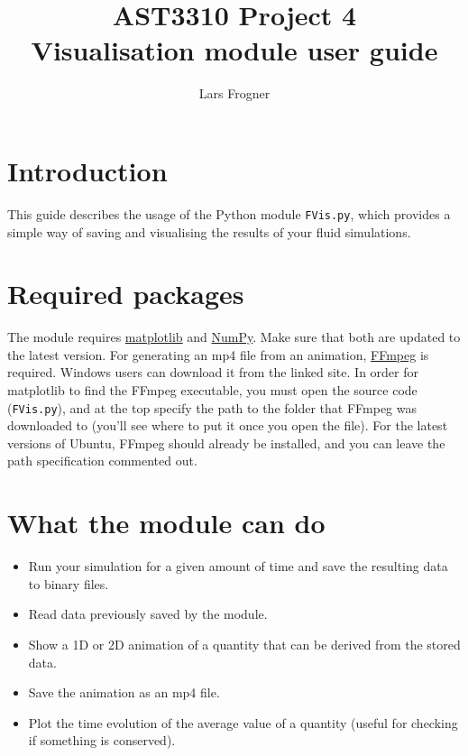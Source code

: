 \documentclass{article}
\title{AST3310 Project 4\\Visualisation module user guide}
\author{Lars Frogner}
\newcommand{\ttt}[1]{\texttt{#1}}
\begin{document}

\maketitle

\newpage

\tableofcontents

\newpage
{}

\section{Introduction}
\label{sec:intr}
This guide describes the usage of the Python module \ttt{FVis.py}, which provides a simple way of saving and visualising the results of your fluid simulations.

\section{Required packages}
\label{sec:pack}
The module requires \href{http://matplotlib.org/}{matplotlib} and \href{http://www.numpy.org/}{NumPy}. Make sure that both are updated to the latest version. For generating an mp4 file from an animation, \href{https://ffmpeg.org/}{FFmpeg} is required. Windows users can download it from the linked site. In order for matplotlib to find the FFmpeg executable, you must open the source code (\ttt{FVis.py}), and at the top specify the path to the folder that FFmpeg was downloaded to (you'll see where to put it once you open the file). For the latest versions of Ubuntu, FFmpeg should already be installed, and you can leave the path specification commented out.

\section{What the module can do}
\label{sec:cando}
\begin{itemize}
	\item Run your simulation for a given amount of time and save the resulting data to binary files.
	\item Read data previously saved by the module.
	\item Show a 1D or 2D animation of a quantity that can be derived from the stored data.
	\item Save the animation as an mp4 file.
	\item Plot the time evolution of the average value of a quantity (useful for checking if something is conserved).
\end{itemize}
\end{document}

